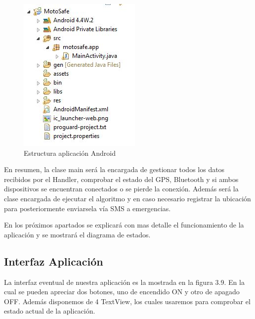 			\begin{figure}[h]
				\centering
				\includegraphics{imagenes/main.JPG}
				\caption{Estructura aplicación Android}
				\label{contexto:figura}
			\end{figure}
			
			En resumen, la clase main será la encargada de gestionar todos los datos recibidos por el Handler, comprobar el estado del GPS, Bluetooth y si ambos dispositivos se encuentran conectados o se pierde la conexión. Además será la clase encargada de ejecutar el algoritmo y en caso necesario registrar la ubicación para posteriormente enviarsela vía SMS a emergencias.
			
			En los próximos apartados se explicará con mas detalle el funcionamiento de la aplicación y se mostrará el diagrama de estados.
				
		
		\subsection{Interfaz Aplicación}
		
			La interfaz eventual de nuestra aplicación es la mostrada en la figura 3.9. En la cual se pueden apreciar dos botones, uno de encendido ON y otro de apagado OFF. Además disponemos de 4 TextView, los cuales usaremos para comprobar el estado actual de la aplicación.
			
